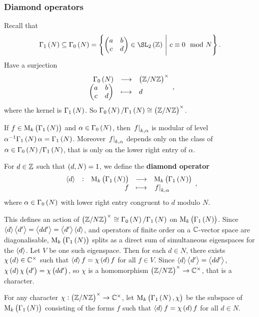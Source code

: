 \subsubsection{Diamond operators}


Recall that
$$ \Gamma_1\br{N} \subseteq \Gamma_0\br{N} = \cbr{\twobytwo{a}{b}{c}{d} \in \SL_2\br{\ZZ} \st c \equiv 0 \mod N}. $$
Have a surjection
$$ \function{\Gamma_0\br{N}}{\unit{N}}{\twobytwo{a}{b}{c}{d}}{d}, $$
where the kernel is $ \Gamma_1\br{N} $. So $ \Gamma_0\br{N} / \Gamma_1\br{N} \cong \unit{N} $.

\begin{note*}
If $ f \in \M_k\br{\Gamma_1\br{N}} $ and $ \alpha \in \Gamma_0\br{N} $, then $ \left. f \right|_{k, \alpha} $ is modular of level $ \alpha^{-1}\Gamma_1\br{N}\alpha = \Gamma_1\br{N} $. Moreover $ \left. f \right|_{k, \alpha} $ depends only on the class of $ \alpha \in \Gamma_0\br{N} / \Gamma_1\br{N} $, that is only on the lower right entry of $ \alpha $.
\end{note*}

\begin{definition}
For $ d \in \mathbb{Z} $ such that $ \br{d, N} = 1 $, we define the \textbf{diamond operator}
$$ \function[\abr{d}]{\M_k\br{\Gamma_1\br{N}}}{\M_k\br{\Gamma_1\br{N}}}{f}{\eval{f}_{k, \alpha}}, $$
where $ \alpha \in \Gamma_0\br{N} $ with lower right entry congruent to $ d $ modulo $ N $.
\end{definition}

This defines an action of $ \unit{N} \cong \Gamma_0\br{N} / \Gamma_1\br{N} $ on $ \M_k\br{\Gamma_1\br{N}} $. Since $ \left\langle d \right\rangle\left\langle d' \right\rangle = \left\langle dd' \right\rangle = \left\langle d' \right\rangle\left\langle d \right\rangle $, and operators of finite order on a $ \mathbb{C} $-vector space are diagonalisable, $ \M_k\br{\Gamma_1\br{N}} $ splits as a direct sum of simultaneous eigenspaces for the $ \left\langle d \right\rangle $. Let $ V $ be one such eigenspace. Then for each $ d \in \unit{N} $, there exists $ \chi\br{d} \in \CC^\times $ such that $ \abr{d}f = \chi\br{d}f $ for all $ f \in V $. Since $ \left\langle d \right\rangle\left\langle d' \right\rangle = \left\langle dd' \right\rangle $, $ \chi\br{d}\chi\br{d'} = \chi\br{dd'} $, so $ \chi $ is a homomorphism $ \unit{N} \to \CC^\times $, that is a character.

\begin{definition}
For any character $ \chi : \unit{N} \to \CC^\times $, let $ \M_k\br{\Gamma_1\br{N}, \chi} $ be the subspace of $ \M_k\br{\Gamma_1\br{N}} $ consisting of the forms $ f $ such that $ \abr{d}f = \chi\br{d}f $ for all $ d \in \unit{N} $.
\end{definition}

